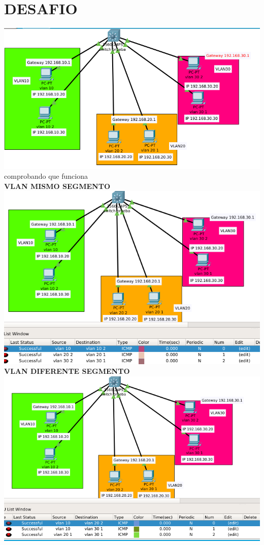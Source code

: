 \section{DESAFIO}
\includegraphics[scale=0.5]{img/DESAFIO.png} 
\\ comprobando que funciona\\
\textbf{VLAN MISMO SEGMENTO}\\
\includegraphics[scale=0.5]{img/11.png} \\
\textbf{VLAN DIFERENTE SEGMENTO}\\
\includegraphics[scale=0.5]{img/00.png} 

